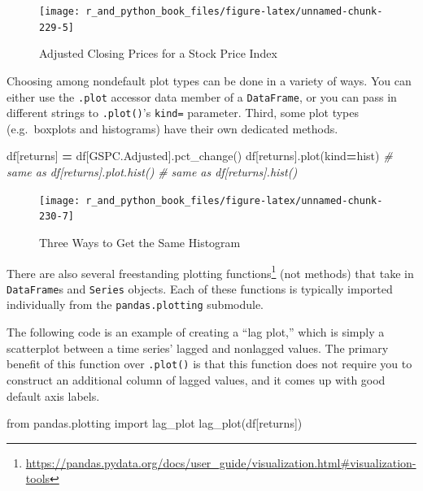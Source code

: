 \documentclass[
  12pt,
  krantz2]{krantz}
\makeatletter
\newenvironment{Shaded}{\begin{snugshade}}{\end{snugshade}}
\newcommand{\CommentTok}[1]{\textcolor[rgb]{0.37,0.37,0.37}{\textit{#1}}}
\newcommand{\ImportTok}[1]{#1}
\newcommand{\NormalTok}[1]{#1}
\newcommand{\OperatorTok}[1]{\textcolor[rgb]{0.43,0.43,0.43}{\textbf{#1}}}
\newcommand{\StringTok}[1]{\textcolor[rgb]{0.5,0.5,0.5}{#1}}
\renewcommand{\href}[2]{#2\footnote{\url{#1}}}
\newenvironment{kframe}{%
\medskip{}
\setlength{\fboxsep}{.8em}
 \def\at@end@of@kframe{}%
 \ifinner\ifhmode%
  \def\at@end@of@kframe{\end{minipage}}%
  \begin{minipage}{\columnwidth}%
 \fi\fi%
 \def\FrameCommand##1{\hskip\@totalleftmargin \hskip-\fboxsep
 \colorbox{shadecolor}{##1}\hskip-\fboxsep
     \hskip-\linewidth \hskip-\@totalleftmargin \hskip\columnwidth}%
 \MakeFramed {\advance\hsize-\width
   \@totalleftmargin\z@ \linewidth\hsize
   \@setminipage}}%
 {\par\unskip\endMakeFramed%
 \at@end@of@kframe}
\renewenvironment{Shaded}{\begin{kframe}}{\end{kframe}}
\makeatother
\begin{document}
\begin{figure}
\texttt{[image: r\_and\_python\_book\_files/figure-latex/unnamed-chunk-229-5]} \caption{Adjusted Closing Prices for a Stock Price Index}\label{fig:unnamed-chunk-229}
\end{figure}

Choosing among nondefault plot types can be done in a variety of ways. You can either use the \texttt{.plot} accessor data member of a \texttt{DataFrame}, or you can pass in different strings to \texttt{.plot()}'s \texttt{kind=} parameter. Third, some plot types (e.g.~boxplots and histograms) have their own dedicated methods.

\begin{Shaded}
\begin{Highlighting}[]
\NormalTok{df[}\StringTok{\textquotesingle{}returns\textquotesingle{}}\NormalTok{] }\OperatorTok{=}\NormalTok{ df[}\StringTok{\textquotesingle{}GSPC.Adjusted\textquotesingle{}}\NormalTok{].pct\_change()}
\NormalTok{df[}\StringTok{\textquotesingle{}returns\textquotesingle{}}\NormalTok{].plot(kind}\OperatorTok{=}\StringTok{\textquotesingle{}hist\textquotesingle{}}\NormalTok{)}
\CommentTok{\# same as df[\textquotesingle{}returns\textquotesingle{}].plot.hist()}
\CommentTok{\# same as df[\textquotesingle{}returns\textquotesingle{}].hist()}
\end{Highlighting}
\end{Shaded}

\begin{figure}
\texttt{[image: r\_and\_python\_book\_files/figure-latex/unnamed-chunk-230-7]} \caption{Three Ways to Get the Same Histogram}\label{fig:unnamed-chunk-230}
\end{figure}

There are also \href{https://pandas.pydata.org/docs/user_guide/visualization.html\#visualization-tools}{several freestanding plotting functions} (not methods) that take in \texttt{DataFrame}s and \texttt{Series} objects. Each of these functions is typically imported individually from the \texttt{pandas.plotting} submodule.

The following code is an example of creating a ``lag plot,'' which is simply a scatterplot between a time series' lagged and nonlagged values. The primary benefit of this function over \texttt{.plot()} is that this function does not require you to construct an additional column of lagged values, and it comes up with good default axis labels.

\begin{Shaded}
\begin{Highlighting}[]
\ImportTok{from}\NormalTok{ pandas.plotting }\ImportTok{import}\NormalTok{ lag\_plot}
\NormalTok{lag\_plot(df[}\StringTok{\textquotesingle{}returns\textquotesingle{}}\NormalTok{])}
\end{Highlighting}
\end{Shaded}
\end{document}
